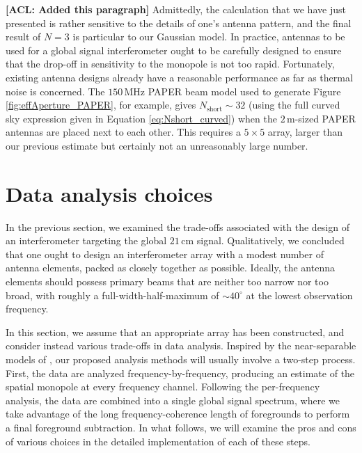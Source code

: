 \documentclass[twocolumn,apj,numberedappendix]{emulateapj}
\newcommand{\acl}[1]{{\color{red} \textbf{[ACL:  #1]}}}
\newcommand{\mep}[1]{{\color{applegreen} \textbf{[MEP:  #1]}}}
\begin{document}
\acl{Added this paragraph} Admittedly, the calculation that we have just presented is rather sensitive to the details of one's antenna pattern, and the final result of $N=3$ is particular to our Gaussian model. In practice, antennas to be used for a global signal interferometer ought to be carefully designed to ensure that the drop-off in sensitivity to the monopole is not too rapid. Fortunately, existing antenna designs already have a reasonable performance as far as thermal noise is concerned. The $150\,\textrm{MHz}$ PAPER beam model used to generate Figure \ref{fig:effAperture_PAPER}, for example, gives $N_\textrm{short} \sim 32$ (using the full curved sky expression given in Equation \ref{eq:Nshort_curved}) when the $2\,\textrm{m}$-sized PAPER antennas are placed next to each other. This requires a $5 \times 5$ array, larger than our previous estimate but certainly not an unreasonably large number.
%


\section{Data analysis choices}
\label{sec:MathForm}

In the previous section, we examined the trade-offs associated with the design of an interferometer targeting the global $21\,\textrm{cm}$ signal. Qualitatively, we concluded that one ought to design an interferometer array with a modest number of antenna elements, packed as closely together as possible. Ideally, the antenna elements should possess primary beams that are neither too narrow nor too broad, with roughly a full-width-half-maximum of $\sim 40^\circ$ at the lowest observation frequency.

In this section, we assume that an appropriate array has been constructed, and consider instead various trade-offs in data analysis. Inspired by the near-separable models of \citet{Liu_Switzer_2014}, our proposed analysis methods will usually involve a two-step process. First, the data are analyzed frequency-by-frequency, producing an estimate of the spatial monopole at every frequency channel. Following the per-frequency analysis, the data are combined into a single global signal spectrum, where we take advantage of the long frequency-coherence length of foregrounds to perform a final foreground subtraction. In what follows, we will examine the pros and cons of various choices in the detailed implementation of each of these steps.
\end{document}
